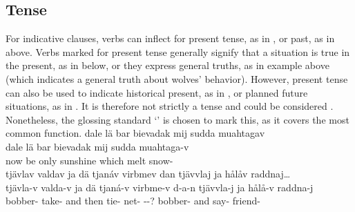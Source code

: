 \subsection{Tense}\label{tense}
For indicative clauses, verbs can inflect for present tense, as in , or past, as in  above. %
Verbs marked for present tense generally signify that a situation is true in the present, as in  below, or they express general truths, as in example  above (which indicates a general truth about wolves’ behavior). However, present tense can also be used to indicate historical present, as in , or planned future situations, as in . It is therefore not strictly a  tense and could be considered . %
Nonetheless, the glossing standard ‘\PRSs’ is chosen to mark this, as it covers the most common function. %
\ea\label{presentEx1}%
\glll	dale lä bar bievadak mij sudda muahtagav\\
	dale lä bar bievadak mij sudda muahtaga-v\\
	now be\BS{} only sunshine\BS{} which\BS{} melt\BS{} snow-\\\nopagebreak
{}	
\z
\ea\label{presentEx2}%
\glll	tjävlav valdav ja dä tjanáv virbmev {dan\footnotemark} tjävvlaj ja hålåv raddnaj…\\
	tjävla-v valda-v ja dä tjaná-v virbme-v d-a-n tjävvla-j ja hålå-v raddna-j\\
	bobber- take- and then tie- net- --? bobber- and say- friend-\\\nopagebreak
{} 	

